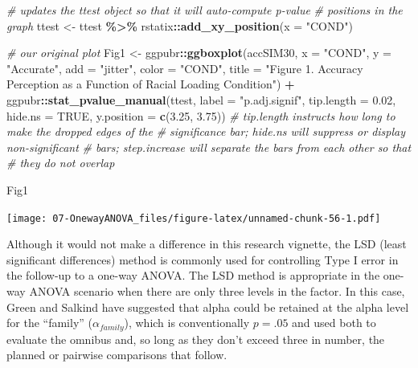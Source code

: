 \documentclass[
  11pt,
]{book}
\newenvironment{Shaded}{\begin{snugshade}}{\end{snugshade}}
\newcommand{\AttributeTok}[1]{\textcolor[rgb]{0.27,0.27,0.27}{#1}}
\newcommand{\CommentTok}[1]{\textcolor[rgb]{0.37,0.37,0.37}{\textit{#1}}}
\newcommand{\ConstantTok}[1]{\textcolor[rgb]{0.37,0.37,0.37}{#1}}
\newcommand{\FloatTok}[1]{\textcolor[rgb]{0.06,0.06,0.06}{#1}}
\newcommand{\FunctionTok}[1]{\textcolor[rgb]{0.27,0.27,0.27}{\textbf{#1}}}
\newcommand{\NormalTok}[1]{#1}
\newcommand{\OtherTok}[1]{\textcolor[rgb]{0.37,0.37,0.37}{#1}}
\newcommand{\SpecialCharTok}[1]{\textcolor[rgb]{0.43,0.43,0.43}{\textbf{#1}}}
\newcommand{\StringTok}[1]{\textcolor[rgb]{0.5,0.5,0.5}{#1}}
\begin{document}
\begin{Shaded}
\begin{Highlighting}[]
\CommentTok{\# updates the ttest object so that it will auto{-}compute p{-}value}
\CommentTok{\# positions in the graph}
\NormalTok{ttest }\OtherTok{\textless{}{-}}\NormalTok{ ttest }\SpecialCharTok{\%\textgreater{}\%}
\NormalTok{    rstatix}\SpecialCharTok{::}\FunctionTok{add\_xy\_position}\NormalTok{(}\AttributeTok{x =} \StringTok{"COND"}\NormalTok{)}

\CommentTok{\# our original plot}
\NormalTok{Fig1 }\OtherTok{\textless{}{-}}\NormalTok{ ggpubr}\SpecialCharTok{::}\FunctionTok{ggboxplot}\NormalTok{(accSIM30, }\AttributeTok{x =} \StringTok{"COND"}\NormalTok{, }\AttributeTok{y =} \StringTok{"Accurate"}\NormalTok{, }\AttributeTok{add =} \StringTok{"jitter"}\NormalTok{,}
    \AttributeTok{color =} \StringTok{"COND"}\NormalTok{, }\AttributeTok{title =} \StringTok{"Figure 1. Accuracy Perception as a Function of Racial Loading Condition"}\NormalTok{) }\SpecialCharTok{+}
\NormalTok{    ggpubr}\SpecialCharTok{::}\FunctionTok{stat\_pvalue\_manual}\NormalTok{(ttest, }\AttributeTok{label =} \StringTok{"p.adj.signif"}\NormalTok{, }\AttributeTok{tip.length =} \FloatTok{0.02}\NormalTok{,}
        \AttributeTok{hide.ns =} \ConstantTok{TRUE}\NormalTok{, }\AttributeTok{y.position =} \FunctionTok{c}\NormalTok{(}\FloatTok{3.25}\NormalTok{, }\FloatTok{3.75}\NormalTok{))}
\CommentTok{\# tip.length instructs how long to make the dropped edges of the}
\CommentTok{\# significance bar; hide.ns will suppress or display non{-}significant}
\CommentTok{\# bars; step.increase will separate the bars from each other so that}
\CommentTok{\# they do not overlap}

\NormalTok{Fig1}
\end{Highlighting}
\end{Shaded}

\texttt{[image: 07-OnewayANOVA\_files/figure-latex/unnamed-chunk-56-1.pdf]}

Although it would not make a difference in this research vignette, the LSD (least significant differences) method is commonly used for controlling Type I error in the follow-up to a one-way ANOVA. The LSD method is appropriate in the one-way ANOVA scenario when there are only three levels in the factor. In this case, Green and Salkind \citeyearpar{green_using_2017} have suggested that alpha could be retained at the alpha level for the ``family'' (\(\alpha_{family}\)), which is conventionally \(p = .05\) and used both to evaluate the omnibus and, so long as they don't exceed three in number, the planned or pairwise comparisons that follow.
\end{document}
